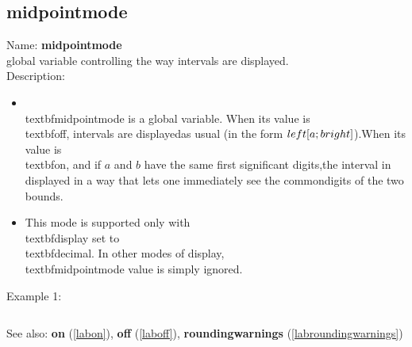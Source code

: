 \subsection{midpointmode}
\label{labmidpointmode}
\noindent Name: \textbf{midpointmode}\\
global variable controlling the way intervals are displayed.\\
\noindent Description: \begin{itemize}

\item \\textbf{midpointmode} is a global variable. When its value is \\textbf{off}, intervals are displayed\n   as usual (in the form $\\left[ a;b\\right]$).\n   When its value is \\textbf{on}, and if $a$ and $b$ have the same first significant digits,\n   the interval in displayed in a way that lets one immediately see the common\n   digits of the two bounds.\n
\item This mode is supported only with \\textbf{display} set to \\textbf{decimal}. In other modes of \n   display, \\textbf{midpointmode} value is simply ignored.\n\end{itemize}
\noindent Example 1: 
\begin{center}\begin{minipage}{15cm}\begin{Verbatim}[frame=single]
\end{Verbatim}
\end{minipage}\end{center}
See also: \textbf{on} (\ref{labon}), \textbf{off} (\ref{laboff}), \textbf{roundingwarnings} (\ref{labroundingwarnings})
